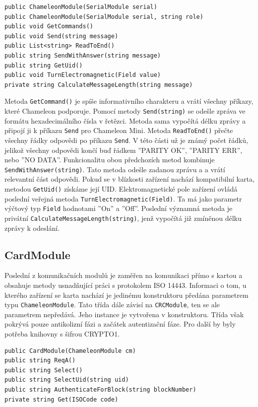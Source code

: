 \begin{lstlisting}[caption=Metody třídy \emph{ChameleonModule}, label={chameleonModuleMethods}]
public ChameleonModule(SerialModule serial)
public ChameleonModule(SerialModule serial, string role)
public void GetCommands()
public void Send(string message)
public List<string> ReadToEnd()
public string SendWithAnswer(string message)
public string GetUid()
public void TurnElectromagnetic(Field value)
private string CalculateMessageLength(string message)
\end{lstlisting}

Metoda \verb|GetCommand()| je spíše informativního charakteru a vrátí všechny příkazy, které Chameleon podporuje. Pomocí metody \verb|Send(string)| se odešle zpráva ve formátu hexadecimálního čísla v řetězci. Metoda sama vypočítá délku zprávy a připojí ji k příkazu \verb|Send| pro Chameleon Mini. Metoda \verb|ReadToEnd()| přečte všechny řádky odpovědi po příkazu \verb|Send|. V této části už je známý počet řádků, jelikož všechny odpovědi končí buď řádkem ''PARITY OK'', ''PARITY ERR'', nebo ''NO DATA''. Funkcionalitu obou předchozích metod kombinuje \verb|SendWithAnswer(string)|. Tato metoda odešle zadanou zprávu a a vrátí relevantní část odpovědi. Pokud se v blízkosti zařízení nachází kompatibilní karta, metodou \verb|GetUid()| získáme její UID. Elektromagnetické pole zařízení ovládá poslední veřejná metoda \verb|TurnElectromagnetic(Field)|. Ta má jako parametr výčtový typ \verb|Field| hodnotami ''On'' a ''Off''. Poslední významná metoda je privátní \verb|CalculateMessageLength(string)|, jenž vypočítá již zmíněnou délku zprávy k odeslání. 

\subsection*{CardModule}
Poslední z komunikačních modulů je zaměřen na komunikaci  přímo s kartou a obsahuje metody usnadňující práci s protokolem ISO 14443. Informaci o tom, u kterého zařízení se karta nachází je jedinému konstruktoru předána parametrem typu \verb|ChameleonModule|. Tato třída dále závisí na \verb|CRCModule|, ten se ale parametrem nepředává. Jeho instance je vytvořena v konstruktoru. Třída však pokrývá pouze antikolizní fázi a začátek autentizační fáze. Pro další by byly potřeba knihovny s šifrou CRYPTO1. 
\begin{lstlisting}[caption=Metody třídy \emph{CardModule}, label={cardModuleMethods}]
public CardModule(ChameleonModule cm)
public string ReqA()
public string Select()
public string SelectUid(string uid)
public string AuthenticateForBlock(string blockNumber)
private string Get(ISOCode code)
\end{lstlisting}

